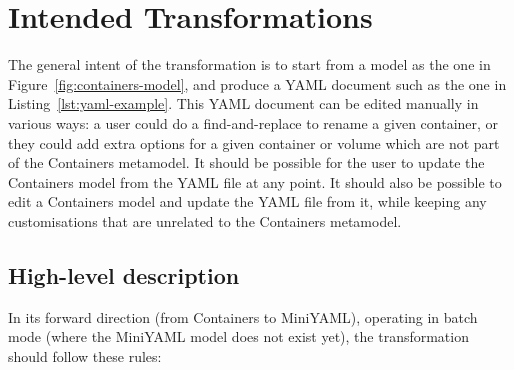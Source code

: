 \documentclass[sigconf,review]{acmart}
\begin{document}
\section{Intended Transformations}

The general intent of the transformation is to start from a model as the one in
Figure~\ref{fig:containers-model}, and produce a YAML document such as the one
in Listing~\ref{lst:yaml-example}. This YAML document can be edited manually in
various ways: a user could do a find-and-replace to rename a given container, or
they could add extra options for a given container or volume which are not part
of the Containers metamodel. It should be possible for the user to update the
Containers model from the YAML file at any point. It should also be possible to
edit a Containers model and update the YAML file from it, while keeping any
customisations that are unrelated to the Containers metamodel.

\subsection{High-level description}

In its forward direction (from Containers to MiniYAML), operating in batch mode
(where the MiniYAML model does not exist yet), the transformation should follow
these rules:
\end{document}

